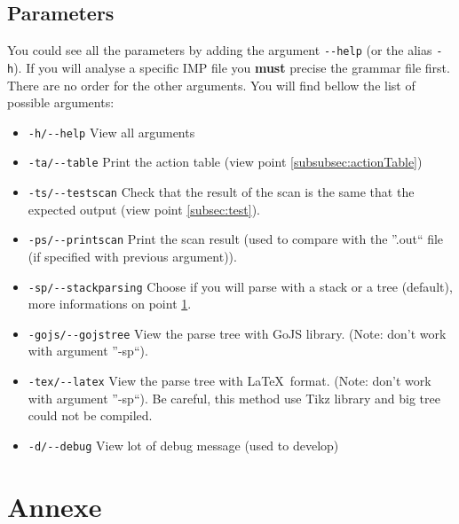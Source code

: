 \documentclass[a4paper,11pt]{article}
\begin{document}
  \subsection{Parameters}
    You could see all the parameters by adding the argument \verb|--help| (or the alias \verb|-h|).  If you will analyse a specific IMP file you \textbf{must} precise the grammar file first.  There are no order for the other arguments.  You will find bellow the list of possible arguments:
    \begin{itemize}
      \item \verb|-h/--help| View all arguments
      \item \verb|-ta/--table| Print the action table (view point \ref{subsubsec:actionTable})
      \item \verb|-ts/--testscan| Check that the result of the scan is the same that the expected output (view point \ref{subsec:test}).
      \item \verb|-ps/--printscan| Print the scan result (used to compare with the ''.out`` file (if specified with previous argument)).
      \item \verb|-sp/--stackparsing| Choose if you will parse with a stack or a tree (default), more informations on point \ref{}. %
      \item \verb|-gojs/--gojstree| View the parse tree with GoJS library. (Note: don't work with argument ''-sp``).
      \item \verb|-tex/--latex| View the parse tree with \LaTeX\ format. (Note: don't work with argument ''-sp``).  Be careful, this method use Tikz library and big tree could not be compiled.
      \item \verb|-d/--debug| View lot of debug message (used to develop)
    \end{itemize}
    

\section{Annexe}
\end{document}
